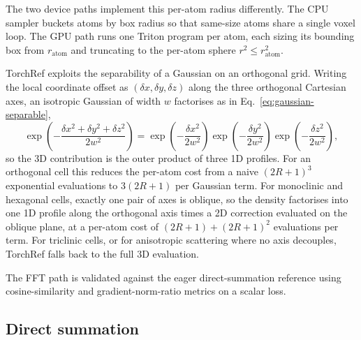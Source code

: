 \documentclass{iucrjournals}
\begin{document}
The two device paths implement this per-atom radius differently. The CPU
sampler buckets atoms by box radius so that same-size atoms share a single
voxel loop.  The GPU path runs one Triton program per atom, each sizing its
bounding box from $r_\mathrm{atom}$ and truncating to the per-atom sphere
$r^{2}\!\leq\!r_\mathrm{atom}^{2}$.

TorchRef exploits the separability of a Gaussian on an orthogonal grid.
Writing the local coordinate offset as $(\delta x, \delta y, \delta z)$ along
the three orthogonal Cartesian axes, an isotropic Gaussian of width $w$
factorises as in Eq.~\ref{eq:gaussian-separable},
%
\begin{equation}
  \exp\!\left(-\frac{\delta x^{2} + \delta y^{2} + \delta z^{2}}{2w^{2}}\right)
  = \exp\!\left(-\frac{\delta x^{2}}{2w^{2}}\right)
    \exp\!\left(-\frac{\delta y^{2}}{2w^{2}}\right)
    \exp\!\left(-\frac{\delta z^{2}}{2w^{2}}\right),
  \label{eq:gaussian-separable}
\end{equation}
%
so the 3D contribution is the outer product of three 1D profiles.
For an orthogonal cell this reduces the per-atom cost from a naive
$(2R+1)^{3}$ exponential evaluations to $3(2R+1)$ per Gaussian term.
For monoclinic and hexagonal cells, exactly one pair of axes is oblique, so
the density factorises into one 1D profile along the orthogonal axis times
a 2D correction evaluated on the oblique plane, at a per-atom cost of
$(2R+1) + (2R+1)^{2}$ evaluations per term.
For triclinic cells, or for anisotropic scattering where no axis decouples,
TorchRef falls back to the full 3D evaluation.

The FFT path is validated against the eager direct-summation reference
using cosine-similarity and gradient-norm-ratio metrics on a scalar loss.

\subsection{Direct summation}
\end{document}
